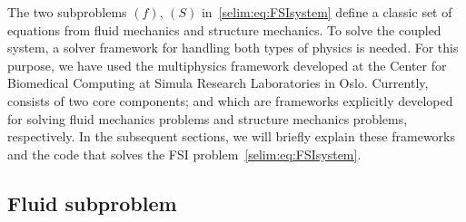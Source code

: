 The two subproblems $(f)$, $(S)$ in~\eqref{selim:eq:FSIsystem} define
a classic set of equations from fluid mechanics and structure
mechanics. To solve the coupled system, a solver framework for
handling both types of physics is needed. For this purpose, we have
used the multiphysics framework  developed at the
Center for Biomedical Computing at Simula Research Laboratories in
Oslo. Currently,  consists of two core components;
 and  which are frameworks explicitly
developed for solving fluid mechanics problems and structure mechanics
problems, respectively.  In the subsequent sections, we will briefly
explain these frameworks and the code that solves the FSI
problem~\eqref{selim:eq:FSIsystem}.

\subsection{Fluid subproblem}

